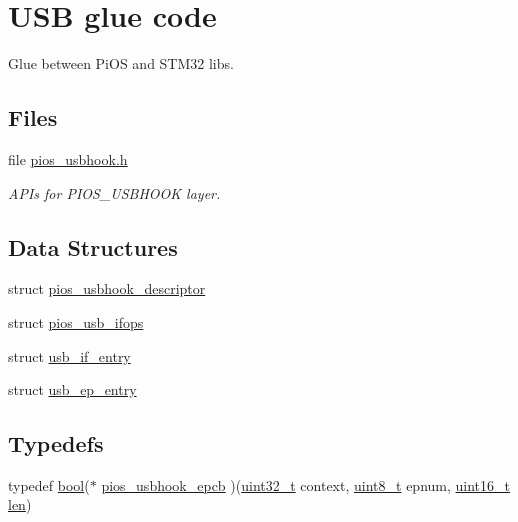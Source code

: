 \hypertarget{group___p_i_o_s___u_s_b_h_o_o_k}{\section{U\-S\-B glue code}
\label{group___p_i_o_s___u_s_b_h_o_o_k}
}


Glue between Pi\-O\-S and S\-T\-M32 libs.  


\subsection*{Files}
\begin{DoxyCompactItemize}
\item 
file \hyperlink{pios__usbhook_8h}{pios\-\_\-usbhook.\-h}
\begin{DoxyCompactList}\small\item\em A\-P\-Is for P\-I\-O\-S\-\_\-\-U\-S\-B\-H\-O\-O\-K layer. \end{DoxyCompactList}\end{DoxyCompactItemize}
\subsection*{Data Structures}
\begin{DoxyCompactItemize}
\item 
struct \hyperlink{structpios__usbhook__descriptor}{pios\-\_\-usbhook\-\_\-descriptor}
\item 
struct \hyperlink{structpios__usb__ifops}{pios\-\_\-usb\-\_\-ifops}
\item 
struct \hyperlink{structusb__if__entry}{usb\-\_\-if\-\_\-entry}
\item 
struct \hyperlink{structusb__ep__entry}{usb\-\_\-ep\-\_\-entry}
\end{DoxyCompactItemize}
\subsection*{Typedefs}
\begin{DoxyCompactItemize}
\item 
typedef \hyperlink{group___exported__types_gaf6a258d8f3ee5206d682d799316314b1}{bool}($\ast$ \hyperlink{group___p_i_o_s___u_s_b_h_o_o_k_ga5f7904cd3922ab7207afebe3d9ef2650}{pios\-\_\-usbhook\-\_\-epcb} )(\hyperlink{stdint_8h_a435d1572bf3f880d55459d9805097f62}{uint32\-\_\-t} context, \hyperlink{stdint_8h_aba7bc1797add20fe3efdf37ced1182c5}{uint8\-\_\-t} epnum, \hyperlink{stdint_8h_a273cf69d639a59973b6019625df33e30}{uint16\-\_\-t} \hyperlink{mavlink__helpers_8h_aba59486c1504340293255a065b546e3a}{len})
\end{DoxyCompactItemize}
